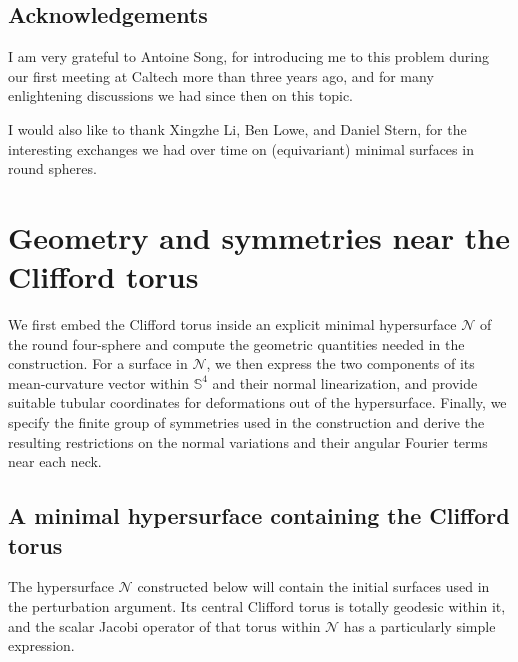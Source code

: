 \documentclass[a4paper,11pt,oneside,reqno]{amsart}
\numberwithin{equation}{section}
\theoremstyle{definition}
\begin{document}
\subsection*{Acknowledgements}
I am very grateful to Antoine Song, for introducing me to this problem during our first meeting at Caltech more than three years ago, and for many enlightening discussions we had since then on this topic.

I would also like to thank Xingzhe Li, Ben Lowe, and Daniel Stern, for the interesting exchanges we had over time on (equivariant) minimal surfaces in round spheres.
\par
\endgroup
%
\section{Geometry and symmetries near the Clifford torus}
\label{sec:s4-geometry}

We first embed the Clifford torus inside an explicit minimal
hypersurface $\mathcal{N}$ of the round four-sphere and compute the geometric quantities needed in the construction. For a surface in $\mathcal{N}$, we then express the two components of its mean-curvature vector within $\mathbb{S}^4$ and their normal linearization, and provide suitable tubular coordinates for deformations out of the hypersurface. Finally, we specify the finite group of symmetries used in the construction and derive the resulting restrictions on the normal variations and their angular Fourier terms near each neck.

\subsection{A minimal hypersurface containing the Clifford torus}

The hypersurface $\mathcal{N}$ constructed below will contain the initial surfaces used in the perturbation argument. Its central Clifford torus is totally geodesic within it, and the scalar Jacobi operator of that torus within $\mathcal{N}$ has a particularly simple expression.
\end{document}
